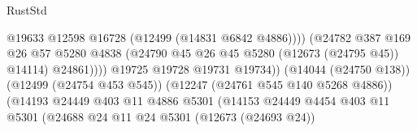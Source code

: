 \begin{lexlean}{RustStd}
\begin{coremodule}
                                                          @19633
                                                          @12598
                                                          @16728
                                                          (@12499 (@14831 @6842 @4886))))
                                                      (@24782
                                                        @387
                                                        @169
                                                        @26
                                                        @57
                                                        @5280
                                                        @4838
                                                        (@24790
                                                          @45
                                                          @26
                                                          @45
                                                          @5280
                                                          (@12673 (@24795 @45))
                                                          @14114)
                                                        @24861))))
                                                @19725
                                                @19728
                                                @19731
                                                @19734))
                                            (@14044 (@24750 @138))
                                            (@12499 (@24754 @453 @545))
                                            (@12247 (@24761 @545 @140 @5268 @4886))
                                            (@14193
                                              @24449
                                              @403
                                              @11
                                              @4886
                                              @5301
                                              (@14153
                                                @24449
                                                @4454
                                                @403
                                                @11
                                                @5301
                                                (@24688
                                                  @24
                                                  @11
                                                  @24
                                                  @5301
                                                  (@12673 (@24693 @24))

\end{coremodule}
\end{lexlean}

